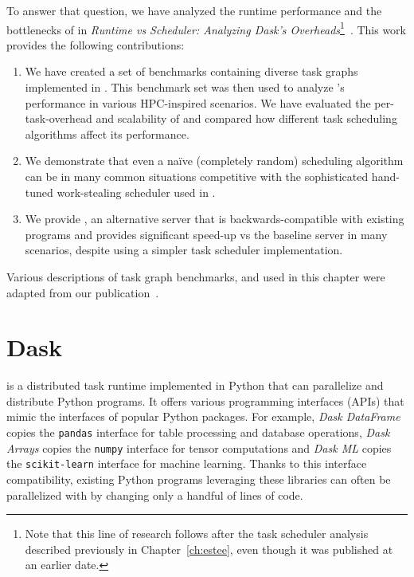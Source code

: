 To answer that question, we have analyzed the runtime performance and the bottlenecks of
\dask{} in \emph{Runtime vs Scheduler: Analyzing Dask's Overheads}\footnote{Note that this line of research follows after the task scheduler analysis described previously in
Chapter~\ref{ch:estee}, even though it was published at an earlier date.}~\cite{rsds}.
This work provides the following contributions:
\begin{enumerate}
	\item We have created a set of benchmarks containing diverse task graphs implemented in
	      \dask{}. This benchmark set was then used to analyze \dask{}'s
	      performance in various HPC-inspired scenarios. We have evaluated the per-task-overhead and
	      scalability of \dask{} and compared how different task scheduling algorithms affect
	      its performance.
	\item We demonstrate that even a naïve (completely random) scheduling algorithm can be in many common
	      situations competitive with the sophisticated hand-tuned work-stealing scheduler used in
	      \dask{}.
	\item We provide \rsds{}, an alternative \dask{} server that is
	      backwards-compatible with existing \dask{} programs and provides significant
	      speed-up vs the baseline \dask{} server in many scenarios, despite using a simpler
	      task scheduler implementation.
\end{enumerate}

Various descriptions of task graph benchmarks, \dask{} and \rsds{}
used in this chapter were adapted from our publication~\cite{rsds}.


\section{Dask}
\label{sec:rsds-dask}
\dask{} is a distributed task runtime implemented in Python that can parallelize
and distribute Python programs. It offers various programming interfaces (APIs) that mimic the
interfaces of popular Python packages. For example, \emph{Dask DataFrame} copies the
\texttt{pandas} interface for table processing and database
operations, \emph{Dask Arrays} copies the \texttt{numpy}
interface for tensor computations and \emph{Dask ML} copies the
\texttt{scikit-learn} interface for machine learning. Thanks to this
interface compatibility, existing Python programs leveraging these libraries can often be
parallelized with \dask{} by changing only a handful of lines of code.

